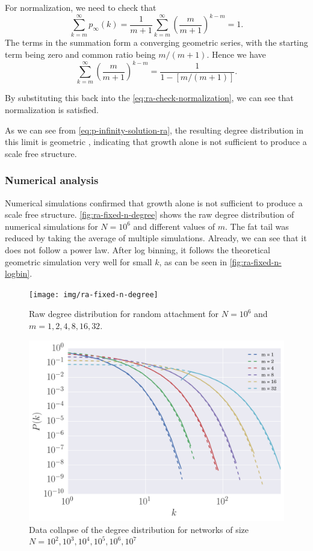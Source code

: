 For normalization, we need to check that 
\begin{equation}
	\sum_{k=m}^{\infty}p_{\infty}(k) = \frac{1}{m+1} \sum_{k=m}^{\infty} \left ( \frac{m}{m+1}\right )^{k-m} = 1.
	\label{eq:ra-check-normalization}
\end{equation}
The terms in the summation form a converging geometric series, with the starting term being zero and common ratio being $m / (m+1)$. Hence we have 
\begin{equation}
	\sum_{k=m}^{\infty} \left ( \frac{m}{m+1} \right )^{k-m} = \frac{1}{1 - [m / (m+1)]}. 
	\label{eq:ra-geom-series}
\end{equation}

By substituting this back into the \autoref{eq:ra-check-normalization}, we can see that normalization is satisfied. 

As we can see from \autoref{eq:p-infinity-solution-ra}, the resulting degree distribution in this limit is geometric \citep{Pekoz2013}, indicating that growth alone is not sufficient to produce a scale free structure. 

\subsubsection{Numerical analysis}\label{subsection:ra-numerical-analysis}
Numerical simulations confirmed that growth alone is not sufficient to produce a scale free structure. \autoref{fig:ra-fixed-n-degree} shows the raw degree distribution of numerical simulations for $N=10^6$ and different values of $m$. The fat tail was reduced by taking the average of multiple simulations. Already, we can see that it does not follow a power law. After log binning, it follows the theoretical geometric simulation very well for small $k$, as can be seen in \autoref{fig:ra-fixed-n-logbin}.

\begin{figure}
    \centering
    \texttt{[image: img/ra-fixed-n-degree]}
    \caption{Raw degree distribution for random attachment for $N = 10^6$ and $m = 1, 2, 4, 8, 16, 32$. }
    \label{fig:ra-fixed-n-degree}
\end{figure}

\begin{figure}
    \centering
    \includegraphics[height=0.5\linewidth]{img/ra-fixed-n-logbin}
    \caption{Data collapse of the degree distribution for networks of size $N=10^2, 10^3, 10^4, 10^5, 10^6, 10^7$}
    \label{fig:ra-fixed-n-logbin}
\end{figure}


